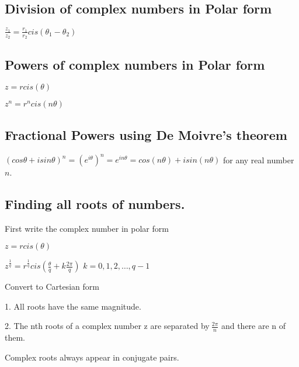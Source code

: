\documentclass{extarticle}
\begin{document}
\subsection{Division of complex numbers in Polar form}

$\frac{z_1}{z_2}=\frac{r_1}{r_2}cis\left(\theta_1-\theta_2\right)$

\subsection{Powers of complex numbers in Polar form}

$z=rcis\left(\theta\right)$

$z^n=r^ncis\left(n\theta\right)$


\subsection{Fractional Powers using De Moivre's theorem}

$\left(cos\theta+isin\theta\right)^n=\left(e^{i\theta}\right)^n=e^{in\theta}=cos\left(n\theta\right)+isin\left(n\theta\right)$
for any real number $n$.


\subsection{Finding all roots of numbers.}

First write the complex number in polar form

$z=rcis\left(\theta\right)$


$z^\frac{1}{q}=r^\frac{1}{q}cis\left(\frac{\theta}{q}+k\frac{2\pi}{q}\right)$ $k=0,1,2,\ldots,q-1$

Convert to Cartesian form

1. All roots have the same magnitude.

2. The nth roots of a complex number z are separated by$\ \frac{2\pi}{n}$ and there are n of them.

Complex roots always appear in conjugate pairs.
\end{document}
